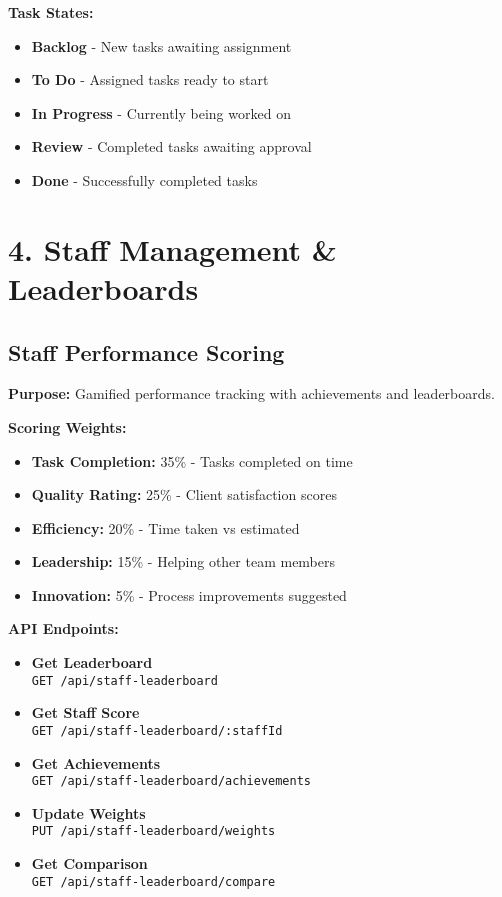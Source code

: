 \documentclass[12pt,a4paper]{article}
\newcommand{\apiendpoint}[2]{\textbf{#1} \\ \texttt{#2}}
\begin{document}
\textbf{Task States:}
\begin{itemize}
    \item \textbf{Backlog} - New tasks awaiting assignment
    \item \textbf{To Do} - Assigned tasks ready to start
    \item \textbf{In Progress} - Currently being worked on
    \item \textbf{Review} - Completed tasks awaiting approval
    \item \textbf{Done} - Successfully completed tasks
\end{itemize}

\section{4. Staff Management \& Leaderboards}

\subsection{Staff Performance Scoring}
\textbf{Purpose:} Gamified performance tracking with achievements and leaderboards.

\textbf{Scoring Weights:}
\begin{itemize}
    \item \textbf{Task Completion:} 35\% - Tasks completed on time
    \item \textbf{Quality Rating:} 25\% - Client satisfaction scores
    \item \textbf{Efficiency:} 20\% - Time taken vs estimated
    \item \textbf{Leadership:} 15\% - Helping other team members
    \item \textbf{Innovation:} 5\% - Process improvements suggested
\end{itemize}

\textbf{API Endpoints:}
\begin{itemize}
    \item \apiendpoint{Get Leaderboard}{GET /api/staff-leaderboard}
    \item \apiendpoint{Get Staff Score}{GET /api/staff-leaderboard/:staffId}
    \item \apiendpoint{Get Achievements}{GET /api/staff-leaderboard/achievements}
    \item \apiendpoint{Update Weights}{PUT /api/staff-leaderboard/weights}
    \item \apiendpoint{Get Comparison}{GET /api/staff-leaderboard/compare}
\end{itemize}
\end{document}
